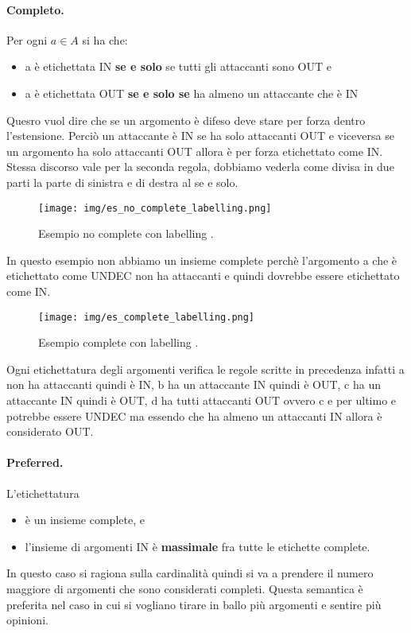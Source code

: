 \paragraph{Completo.}
Per ogni $a \in A$ si ha che:
\begin{itemize}
    \item a è etichettata IN \textbf{se e solo} se tutti gli attaccanti sono OUT e
    \item a è etichettata OUT\textbf{ se e solo se} ha almeno un attaccante che è IN
\end{itemize}
Quesro vuol dire che se un argomento è difeso deve stare per forza dentro l'estensione. Perciò un attaccante è IN se ha solo attaccanti OUT e viceversa se un argomento ha solo attaccanti OUT allora è per forza etichettato come IN. Stessa discorso vale per la seconda regola, dobbiamo vederla come divisa in due parti la parte di sinistra e di destra al se e solo. 

\begin{figure}[H]
    \centering
    \texttt{[image: img/es\_no\_complete\_labelling.png]}
    \caption{Esempio no complete con labelling .}\label{fig:es_no_complete_labelling}
\end{figure}
In questo esempio non abbiamo un insieme complete perchè l'argomento a che è etichettato come UNDEC non ha attaccanti e quindi dovrebbe essere etichettato come IN.

\begin{figure}[H]
    \centering
    \texttt{[image: img/es\_complete\_labelling.png]}
    \caption{Esempio  complete con labelling .}\label{fig:es_no_complete_labelling}
\end{figure}
Ogni etichettatura degli argomenti verifica le regole scritte in precedenza infatti a non ha attaccanti quindi è IN, b ha un attaccante IN quindi è OUT, c ha un attaccante IN quindi è OUT, d ha tutti attaccanti OUT ovvero c e per ultimo e potrebbe essere UNDEC ma essendo che ha almeno un attaccanti IN allora è considerato OUT.

\paragraph{Preferred.}
L'etichettatura
\begin{itemize}
    \item è un insieme complete, e 
    \item l'insieme di argomenti IN è \textbf{massimale} fra tutte le etichette complete.
\end{itemize}
In questo caso si ragiona sulla cardinalità quindi si va a prendere il numero maggiore di argomenti che sono considerati completi. Questa semantica è preferita nel caso in cui si vogliano tirare in ballo più argomenti e sentire più opinioni.

